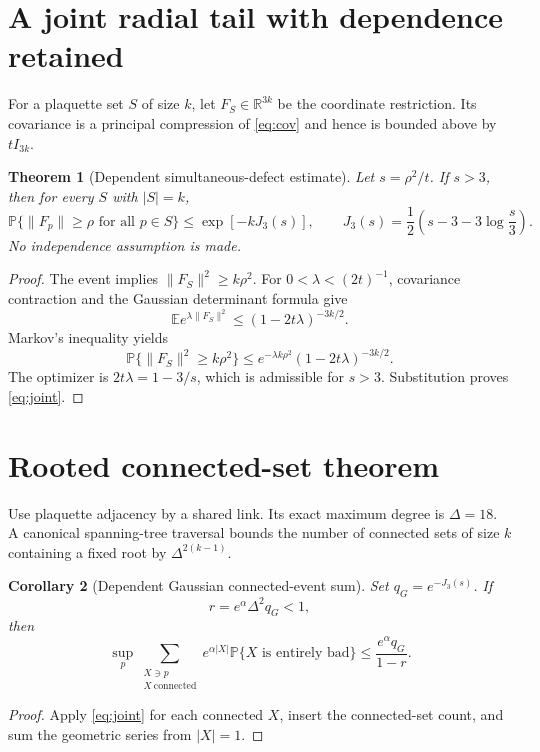 \documentclass[11pt]{article}
\newtheorem{theorem}{Theorem}[section]
\newtheorem{corollary}[theorem]{Corollary}
\newcommand{\E}{\mathbb E}
\newcommand{\Pp}{\mathbb P}
\begin{document}
\section{A joint radial tail with dependence retained}

For a plaquette set $S$ of size $k$, let $F_S\in\mathbb R^{3k}$ be the
coordinate restriction.  Its covariance is a principal compression of
\eqref{eq:cov} and hence is bounded above by $tI_{3k}$.

\begin{theorem}[Dependent simultaneous-defect estimate]
Let $s=\rho^2/t$.  If $s>3$, then for every $S$ with $|S|=k$,
\begin{equation}
 \Pp\{\|F_p\|\geq\rho\text{ for all }p\in S\}
 \leq \exp[-kJ_3(s)],
 \qquad
 J_3(s)=\frac12\left(s-3-3\log\frac{s}{3}\right).
 \label{eq:joint}
\end{equation}
No independence assumption is made.
\end{theorem}
\begin{proof}
The event implies $\|F_S\|^2\geq k\rho^2$.  For
$0<\lambda<(2t)^{-1}$, covariance contraction and the Gaussian determinant
formula give
\[
 \E e^{\lambda\|F_S\|^2}
 \leq(1-2t\lambda)^{-3k/2}.
\]
Markov's inequality yields
\[
 \Pp\{\|F_S\|^2\geq k\rho^2\}
 \leq e^{-\lambda k\rho^2}(1-2t\lambda)^{-3k/2}.
\]
The optimizer is $2t\lambda=1-3/s$, which is admissible for $s>3$.
Substitution proves \eqref{eq:joint}.
\end{proof}

\section{Rooted connected-set theorem}

Use plaquette adjacency by a shared link.  Its exact maximum degree is
$\Delta=18$.  A canonical spanning-tree traversal bounds the number of
connected sets of size $k$ containing a fixed root by $\Delta^{2(k-1)}$.

\begin{corollary}[Dependent Gaussian connected-event sum]
Set $q_G=e^{-J_3(s)}$.  If
\begin{equation}
 r=e^\alpha\Delta^2q_G<1,
 \label{eq:ratio}
\end{equation}
then
\begin{equation}
 \sup_p\sum_{\substack{X\ni p\\ X\ \mathrm{connected}}}
 e^{\alpha|X|}\Pp\{X\text{ is entirely bad}\}
 \leq\frac{e^\alpha q_G}{1-r}.
 \label{eq:rooted}
\end{equation}
\end{corollary}
\begin{proof}
Apply \eqref{eq:joint} for each connected $X$, insert the connected-set count,
and sum the geometric series from $|X|=1$.
\end{proof}
\end{document}
